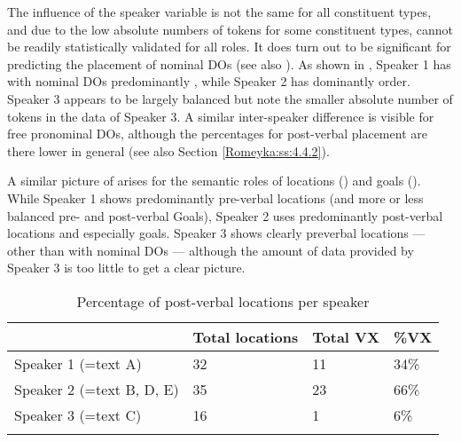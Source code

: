 \documentclass[output=paper,colorlinks,citecolor=brown]{langscibook}
\begin{document}
\begin{table}[b]
    \caption{Percentage of post-verbal nominal direct objects per speaker}
    \label{Romeyka:tab:2}
\end{table}

The influence of the speaker variable is not the same for all constituent types, and due to the low absolute numbers of tokens for some constituent types, cannot be readily statistically validated for all roles. It does turn out to be significant for predicting the placement of nominal DOs (see also \citealt{craevschi_historical_2022}). As shown in , Speaker 1 has with nominal DOs predominantly , while {Speaker 2} has dominantly  order. Speaker 3 appears to be largely balanced but note the smaller absolute number of tokens in the data of Speaker 3. A similar inter-speaker difference is visible for free pronominal DOs, although the percentages for post-verbal placement are there lower in general (see also Section \ref{Romeyka:ss:4.4.2}).


\begin{sloppypar}
A similar picture of  arises for the semantic roles of locations () and goals (). While Speaker 1 shows predominantly pre-verbal locations (and more or less balanced pre- and post-verbal Goals), Speaker 2 uses predominantly post-verbal locations and especially goals. Speaker 3 shows clearly preverbal locations --- other than with nominal DOs --- although the amount of data provided by Speaker 3 is too little to get a clear picture.
\end{sloppypar}

\begin{table}
    \begin{tabularx}{\textwidth}{lYYY}
\lsptoprule
 & Total locations & Total VX & \%VX \\
\midrule
Speaker 1 (=text A) & 32 & 11 & 34\% \\
Speaker 2 (=text B, D, E) & 35 & 23 & 66\% \\
Speaker 3 (=text C) & 16 & 1 & 6\% \\
\lspbottomrule
    \end{tabularx}
    \caption{Percentage of post-verbal locations per speaker}
    \label{Romeyka:tab:3}
\end{table}
\end{document}
